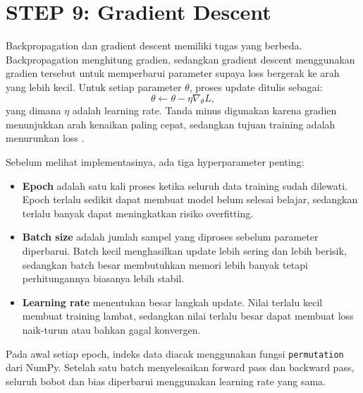 \documentclass[12pt, letterpaper]{article}
\begin{document}
\section*{STEP 9: Gradient Descent}
Backpropagation dan gradient descent memiliki tugas yang berbeda. Backpropagation menghitung gradien, sedangkan gradient descent menggunakan gradien tersebut untuk memperbarui parameter supaya loss bergerak ke arah yang lebih kecil. Untuk setiap parameter $\theta$, proses update ditulis sebagai:
\begin{equation}
  \theta \leftarrow \theta - \eta\nabla_{\theta}L,
\end{equation}
yang dimana $\eta$ adalah learning rate. Tanda minus digunakan karena gradien menunjukkan arah kenaikan paling cepat, sedangkan tujuan training adalah menurunkan loss \cite{goodfellow2016deep}.

Sebelum melihat implementasinya, ada tiga hyperparameter penting:
\begin{itemize}
  \item \textbf{Epoch} adalah satu kali proses ketika seluruh data training sudah dilewati. Epoch terlalu sedikit dapat membuat model belum selesai belajar, sedangkan terlalu banyak dapat meningkatkan risiko overfitting.
  \item \textbf{Batch size} adalah jumlah sampel yang diproses sebelum parameter diperbarui. Batch kecil menghasilkan update lebih sering dan lebih berisik, sedangkan batch besar membutuhkan memori lebih banyak tetapi perhitungannya biasanya lebih stabil.
  \item \textbf{Learning rate} menentukan besar langkah update. Nilai terlalu kecil membuat training lambat, sedangkan nilai terlalu besar dapat membuat loss naik-turun atau bahkan gagal konvergen.
\end{itemize}

Pada awal setiap epoch, indeks data diacak menggunakan fungsi \texttt{permutation} dari NumPy. Setelah satu batch menyelesaikan forward pass dan backward pass, seluruh bobot dan bias diperbarui menggunakan learning rate yang sama.
\end{document}

